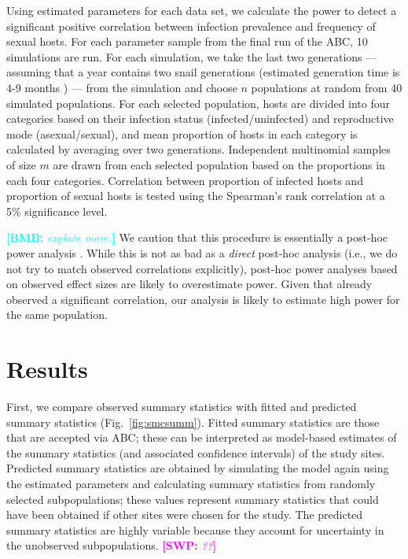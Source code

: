 \documentclass{article}\usepackage[]{graphicx}\usepackage[]{color}
\newcommand{\comment}[3]{\textcolor{#1}{\textbf{[#2: }\textit{#3}\textbf{]}}}
\newcommand{\bmb}[1]{\comment{cyan}{BMB}{#1}}
\newcommand{\swp}[1]{\comment{magenta}{SWP}{#1}}
\newcommand{\fref}[1]{Fig.~\ref{fig:#1}}
\begin{document}
Using estimated parameters for each data set, we calculate the power to detect a significant positive correlation between infection prevalence and frequency of sexual hosts.
For each parameter sample from the final run of the ABC, 10 simulations are run.
For each simulation, we take the last two generations --- assuming that a year contains two snail generations (estimated generation time is 4-9 months \citep{neiman2005variation}) --- from the simulation and choose $n$ populations at random from 40 simulated populations.
For each selected population, hosts are divided into four categories based on their infection status (infected/uninfected) and reproductive mode (asexual/sexual),
and mean proportion of hosts in each category is calculated by averaging over two generations.
Independent multinomial samples of size $m$ are drawn from each selected population based on the proportions  in each four categories. 
Correlation between proportion of infected hosts and proportion of sexual hosts is tested using the Spearman's rank correlation at a 5\% significance level.

\bmb{explain more.}
We caution that this procedure is essentially a post-hoc power analysis \citep{goodman1994use, senn2002power}.
While this is not as bad as a \emph{direct} post-hoc analysis (i.e., we do not try to match observed correlations explicitly), 
post-hoc power analyses based on observed effect sizes are likely to overestimate power.
Given that \cite{mckone2016fine} already observed a significant correlation, our analysis is likely to estimate high power for the same population.

\section{Results}

First, we compare observed summary statistics with fitted and predicted summary statistics (\fref{smcsumm}).
Fitted summary statistics are those that are accepted via ABC;
these can be interpreted as model-based estimates of the summary statistics (and associated confidence intervals) of the study sites.
Predicted summary statistics are obtained by simulating the model again using the estimated parameters and calculating summary statistics from randomly selected subpopulations;
these values represent summary statistics that could have been obtained if other sites were chosen for the study.
The predicted summary statistics are highly variable because they account for uncertainty in the unobserved subpopulations. \swp{??}
\end{document}
